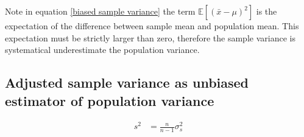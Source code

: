 \documentclass{article}
\begin{document}
Note in equation \ref{biased sample variance} the term $ \mathbb{E} \left[(\bar{x} - \mu)^2\right] $ is the expectation of the difference between sample mean and population mean. This expectation must be strictly larger than zero, therefore the sample variance is systematical underestimate the population variance.

\subsection{Adjusted sample variance as unbiased estimator of population variance}

\begin{align}
    s^2 &= \frac{n}{n - 1} \sigma_s^2
\end{align}
\end{document}
